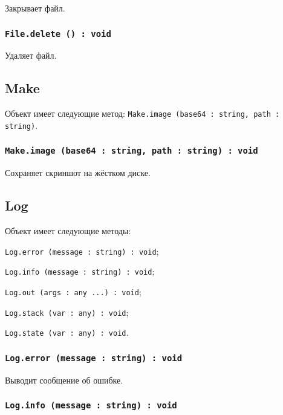 Закрывает файл.

\subsubsection{\texttt{File.delete () : void}}

Удаляет файл.

\subsection{{\color{orange} Make}}

Объект \make{} имеет следующие метод: \texttt{Make.image (base64 : string, path : string)}.

\subsubsection{\texttt{Make.image (base64 : string, path : string) : void}}

Сохраняет скриншот на жёстком диске.

\subsection{{\color{orange} Log}}

Объект \logtype{} имеет следующие методы:
\begin{icItems}
	\item \texttt{Log.error (message : string) : void};
	\item \texttt{Log.info (message : string) : void};
	\item \texttt{Log.out (args : any ...) : void};
	\item \texttt{Log.stack (var : any) : void};
	\item \texttt{Log.state (var : any) : void}.
\end{icItems}

\subsubsection{\texttt{Log.error (message : string) : void}}

Выводит сообщение об ошибке.

\subsubsection{\texttt{Log.info (message : string) : void}}

